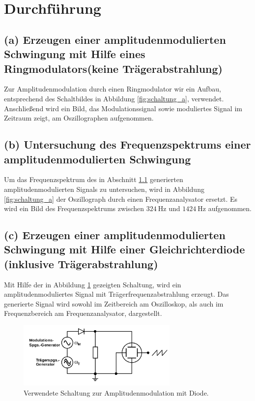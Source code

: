 \newpage
\section{Durchführung}
\label{sec:Durchführung}

\FloatBarrier
\subsection{(a) Erzeugen einer amplitudenmodulierten Schwingung mit
Hilfe eines Ringmodulators(keine Trägerabstrahlung)}
\label{subsec:durchfuehrung_a}
Zur Amplitudenmodulation durch einen Ringmodulator wir ein Aufbau,
entsprechend des Schaltbildes in Abbildung \ref{fig:schaltung_a}, verwendet.
Anschließend wird ein Bild, das Modulationssignal sowie moduliertes
Signal im Zeitraum zeigt, am Oszillographen aufgenommen.
% 

\FloatBarrier
\subsection{(b) Untersuchung des Frequenzspektrums einer
amplitudenmodulierten Schwingung}
\label{subsec:durchfuehrung_b}
Um das Frequenzspektrum des in Abschnitt \ref{subsec:durchfuehrung_a} generierten
amplitudenmodulierten Signals zu untersuchen, wird in Abbildung
\ref{fig:schaltung_a} der Oszillograph durch einen Frequenzanalysator ersetzt.
Es wird ein Bild des Frequenzspektrums zwischen $\SI{324}{\hertz}$ und $\SI{1424}{\hertz}$
aufgenommen.

\FloatBarrier
\subsection{(c) Erzeugen einer amplitudenmodulierten Schwingung
mit Hilfe einer Gleichrichterdiode (inklusive Trägerabstrahlung)}
\label{subsec:durchfuehrung_c}
Mit Hilfe der in Abbildung \ref{fig:schaltung_c} gezeigten Schaltung,
wird ein amplitudenmoduliertes Signal mit Trägerfrequenzabstrahlung erzeugt.
Das generierte Signal wird sowohl im Zeitbereich am Oszilloskop, als auch
im Frequenzbereich am Frequenzanalysator, dargestellt.

\begin{figure}
  \centering
  \includegraphics[width=0.7\textwidth]{figures/c_d.png}
  \caption{Verwendete Schaltung zur Amplitudenmodulation mit Diode.\cite{sample}}
  \label{fig:schaltung_c}
\end{figure}


